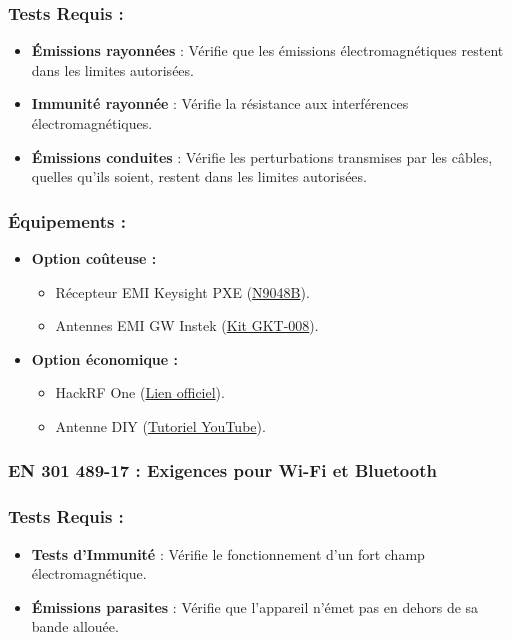 \documentclass[a4paper,12pt]{article}
\begin{document}
\subsubsection*{Tests Requis :}
\begin{itemize}
    \item \textbf{Émissions rayonnées} : Vérifie que les émissions électromagnétiques restent dans les limites autorisées.
    \item \textbf{Immunité rayonnée} : Vérifie la résistance aux interférences électromagnétiques.
    \item \textbf{Émissions conduites} : Vérifie les perturbations transmises par les câbles, quelles qu'ils soient, restent dans les limites autorisées.
\end{itemize}

\subsubsection*{Équipements :}
\begin{itemize}
    \item \textbf{Option coûteuse :}
          \begin{itemize}
              \item Récepteur EMI Keysight PXE (\href{https://www.keysight.com/us/en/product/N9048B/pxe-emi-receiver-1-hz-44-ghz.html}{N9048B}).
              \item Antennes EMI GW Instek (\href{https://eleshop.fr/gw-instek-gkt-008-emi-probe-kit.html}{Kit GKT-008}).
          \end{itemize}
    \item \textbf{Option économique :}
          \begin{itemize}
              \item HackRF One (\href{https://greatscottgadgets.com/hackrf/one/}{Lien officiel}).
              \item Antenne DIY (\href{https://www.youtube.com/watch?v=2xy3Hm1_ZqI}{Tutoriel YouTube}).
          \end{itemize}
\end{itemize}

\subsubsection{EN 301 489-17 : Exigences pour Wi-Fi et Bluetooth}
\subsubsection*{Tests Requis :}
\begin{itemize}
    \item \textbf{Tests d'Immunité} : Vérifie le fonctionnement d'un fort champ électromagnétique.
    \item \textbf{Émissions parasites} : Vérifie que l’appareil n’émet pas en dehors de sa bande allouée.
\end{itemize}
\end{document}
